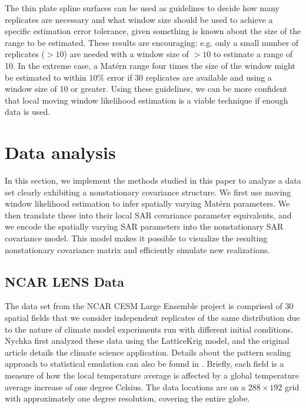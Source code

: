 \documentclass[review]{elsarticle}
\begin{document}
The thin plate spline surfaces can be used as guidelines to decide how many replicates are necessary and what window size should be used to achieve a specific estimation error tolerance, given something is known about the size of the range to be estimated. These results are encouraging: e.g. only a small number of replicates ($>10$) are needed with a window size of $>10$ to estimate a range of 10. In the extreme case, a Mat\'ern range four times the size of the window might be estimated to within $10\%$ error if 30 replicates are available and using a window size of 10 or greater. Using these guidelines, we can be more confident that local moving window likelihood estimation is a viable technique if enough data is used.















\section{Data analysis}

In this section, we implement the methods studied in this paper to analyze a data set clearly exhibiting a nonstationary covariance structure. We first use moving window likelihood estimation to infer spatially varying Mat\'ern parameters. We then translate these into their local SAR covariance parameter equivalents, and we encode the spatially varying SAR parameters into the nonstationary SAR covariance model. This model makes it possible to visualize the resulting nonstationary covariance matrix and efficiently simulate new realizations.

\subsection{NCAR LENS Data}

The data set from the NCAR CESM Large Ensemble project \cite{kay2015community} is comprised of 30 spatial fields that we consider independent replicates of the same distribution due to the nature of climate model experiments run with different initial conditions. Nychka \cite{nychka2018modeling} first analyzed these data using the LatticeKrig model, and the original article details the climate science application. Details about the pattern scaling approach to statistical emulation can also be found in \cite{alexeeff2018emulating}. Briefly, each field is a measure of how the local temperature average is affected by a global temperature average increase of one degree Celsius. The data locations are on a $288 \times 192$ grid with approximately one degree resolution, covering the entire globe. 
\end{document}
